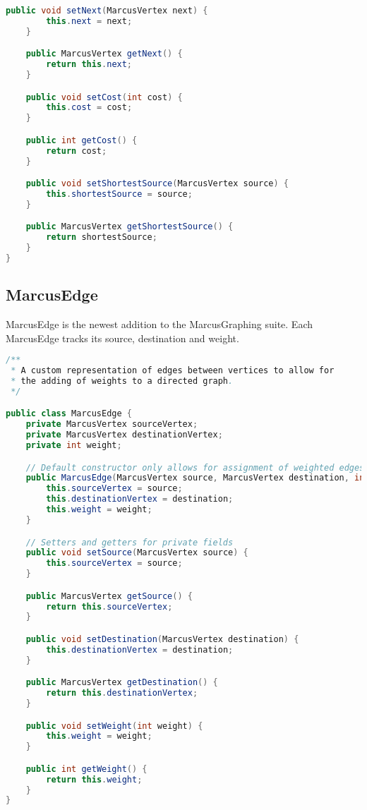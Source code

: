 \documentclass[letterpaper, 10pt]{article}
\begin{document}
\begin{lstlisting}[language=Java, firstnumber=1]
    public void setNext(MarcusVertex next) {
        this.next = next;
    }

    public MarcusVertex getNext() {
        return this.next;
    }

    public void setCost(int cost) {
        this.cost = cost;
    }

    public int getCost() {
        return cost;
    }

    public void setShortestSource(MarcusVertex source) {
        this.shortestSource = source;
    }

    public MarcusVertex getShortestSource() {
        return shortestSource;
    }
}
\end{lstlisting}

\subsection{MarcusEdge}

\hspace{1.0em}MarcusEdge is the newest addition to the MarcusGraphing suite. Each MarcusEdge tracks its source, destination and weight.

\begin{lstlisting}[language=Java, firstnumber=1]
/**
 * A custom representation of edges between vertices to allow for
 * the adding of weights to a directed graph.
 */

public class MarcusEdge {
    private MarcusVertex sourceVertex;
    private MarcusVertex destinationVertex;
    private int weight;

    // Default constructor only allows for assignment of weighted edges
    public MarcusEdge(MarcusVertex source, MarcusVertex destination, int weight) {
        this.sourceVertex = source;
        this.destinationVertex = destination;
        this.weight = weight;
    }

    // Setters and getters for private fields
    public void setSource(MarcusVertex source) {
        this.sourceVertex = source;
    }

    public MarcusVertex getSource() {
        return this.sourceVertex;
    }

    public void setDestination(MarcusVertex destination) {
        this.destinationVertex = destination;
    }

    public MarcusVertex getDestination() {
        return this.destinationVertex;
    }

    public void setWeight(int weight) {
        this.weight = weight;
    }

    public int getWeight() {
        return this.weight;
    }
}
\end{lstlisting}
\end{document}
